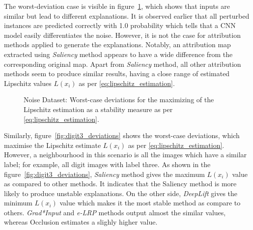 \documentclass[english]{tktltiki2}
\theoremstyle{definition}
\theoremstyle{remark}
\begin{document}
The worst-deviation case is visible in figure~\ref{fig:digit3_noise_deviations}, which shows that inputs are similar but lead to different explanations. It is observed earlier that all perturbed instances are predicted correctly with 1.0 probability which tells that a CNN model easily differentiates the noise. However, it is not the case for attribution methods applied to generate the explanations. Notably, an attribution map extracted using \textit{Saliency} method appears to have a wide difference from the corresponding original map. Apart from \textit{Saliency} method, all other attribution methods seem to produce similar results, having a close range of estimated Lipschitz values $L(x_i)$ as per \eqref{eq:lipschitz_estimation}.

\begin{figure}[H]
	\centering
	\qquad
	\qquad
	\qquad
	\qquad
	\caption{Noise Dataset: Worst-case deviations for the maximizing of the Lipschitz estimation as a stability measure as per \eqref{eq:lipschitz_estimation}.}%
	\label{fig:digit3_noise_deviations}%
\end{figure}

Similarly, figure~\ref{fig:digit3_deviations} shows the worst-case deviations, which maximise the Lipschitz estimate $L(x_i)$ as per \eqref{eq:lipschitz_estimation}. However, a neighbourhood in this scenario is all the images which have a similar label; for example, all digit images with label three. As shown in the figure~\ref{fig:digit3_deviations}, \textit{Saliency} method gives the maximum $L(x_i)$ value as compared to other methods. It indicates that the Saliency method is more likely to produce unstable explanations. On the other side, \textit{DeepLift} gives the minimum $L(x_i)$ value which makes it the most stable method as compare to others. \textit{Grad*Input} and \textit{e-LRP} methods output almost the similar values, whereas Occlusion estimates a slighly higher value.
\end{document}
